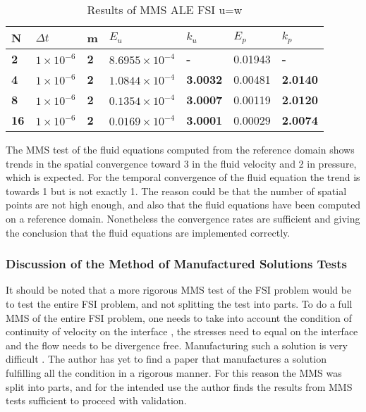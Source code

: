 \begin{table}[H]
\centering
\caption{Results of MMS ALE FSI u=w}
\label{tab:MMS_Fluid_space}
\begin{tabular}{|l|l|l|l|l|l|l|}
\hline
\textbf{N}  & $\Delta t$ & \textbf{m} & $E_u$                   & \textbf{$k_u$}  & $E_p$   & \textbf{$k_p$}  \\ \hline
\textbf{2}  & $1 \times 10^{-6}$ & \textbf{2} & $8.6955 \times 10^{-4}$ & \textbf{-}      & 0.01943 & \textbf{-}      \\ \hline
\textbf{4}  & $1 \times 10^{-6}$ & \textbf{2} & $1.0844 \times 10^{-4}$ & \textbf{3.0032} & 0.00481 & \textbf{2.0140} \\ \hline
\textbf{8}  & $1 \times 10^{-6}$ & \textbf{2} & $0.1354 \times 10^{-4}$ & \textbf{3.0007} & 0.00119 & \textbf{2.0120} \\ \hline
\textbf{16} & $1 \times 10^{-6}$ & \textbf{2} & $0.0169 \times 10^{-4}$ & \textbf{3.0001} & 0.00029 & \textbf{2.0074} \\ \hline
\end{tabular}
\end{table}

The MMS test of the fluid equations computed from the reference domain shows trends in the spatial convergence toward 3 in the fluid velocity and 2 in pressure, which is expected. For the temporal convergence of the fluid equation the trend is towards 1 but is not exactly 1. The reason could be that the number of spatial points are not high enough, and also that the fluid equations have been computed on a reference domain. Nonetheless the convergence rates are sufficient and giving the conclusion that the fluid equations are implemented correctly.

\subsubsection*{Discussion of the Method of Manufactured Solutions Tests}

It should be noted that a more rigorous MMS test of the FSI problem would be to test the entire FSI problem, and not splitting the test into parts. To do a full MMS of the entire FSI problem, one needs to take into account the condition of continuity of velocity on the interface \cite{Etienne2006}, the stresses need to equal on the interface and the flow needs to be divergence free. Manufacturing such a solution is very difficult \cite{Etienne2012}. The author has yet to find a paper that manufactures a solution fulfilling all the condition in a rigorous manner. For this reason the MMS was split into parts, and for the intended use the author finds the results from MMS tests sufficient to proceed with validation.

